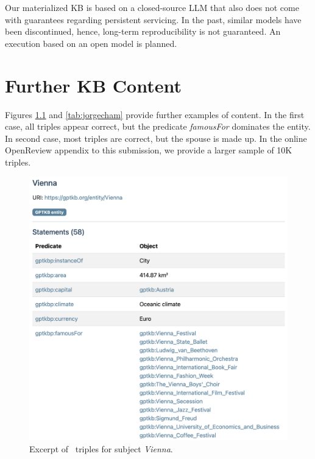 Our materialized KB is based on a closed-source LLM that also does not come with guarantees regarding persistent servicing. In the past, similar models have been discontinued, hence, long-term reproducibility is not guaranteed. An execution based on an open model is planned.








\appendix

\chapter{Further KB Content}

Figures \ref{tab:vienna} and \ref{tab:jorgecham} provide further examples of \ourkb{} content. In the first case, all triples appear correct, but the predicate \textit{famousFor} dominates the entity. In second case, most triples are correct, but the spouse is made up. In the online OpenReview appendix to this submission, we provide a larger sample of 10K triples.

\begin{figure}[ht]
\includegraphics[width=\columnwidth]{figures/vienna.png}
\caption{Excerpt of \ourkb\ triples for subject \textit{Vienna}.}
\label{tab:vienna}
\end{figure}

